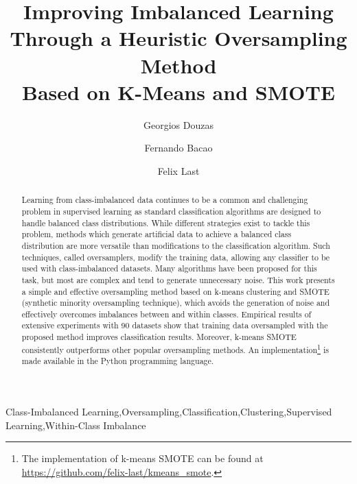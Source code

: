 \documentclass[sort&compress]{elsarticle}
\begin{document}
\begin{frontmatter}

\title{Improving Imbalanced Learning \\Through a Heuristic Oversampling Method \\Based on K-Means and SMOTE}

\author[nova]{Georgios Douzas}
\author[nova]{Fernando Bacao}
\author[nova]{Felix Last}
\address[nova]{Nova Information Management School, Campus de Campolide, 1070-312 Lisboa, Portugal \\ Telephone: +351 21 382 8610}

\begin{abstract}
Learning from class-imbalanced data continues to be a common and challenging problem in supervised learning as standard classification algorithms are designed to handle balanced class distributions. While different strategies exist to tackle this problem, methods which generate artificial data to achieve a balanced class distribution are more versatile than modifications to the classification algorithm. Such techniques, called oversamplers, modify the training data, allowing any classifier to be used with class-imbalanced datasets. Many algorithms have been proposed for this task, but most are complex and tend to generate unnecessary noise. This work presents a simple and effective oversampling method based on k-means clustering and SMOTE (synthetic minority oversampling technique), which avoids the generation of noise and effectively overcomes imbalances between and within classes. Empirical results of extensive experiments with 90 datasets show that training data oversampled with the proposed method improves classification results. Moreover, k-means SMOTE consistently outperforms other popular oversampling methods. An implementation\footnote{The implementation of k-means \acs{SMOTE} can be found at \url{https://github.com/felix-last/kmeans_smote}.} is made available in the Python programming language.
\end{abstract}

\begin{keyword}
Class-Imbalanced Learning\sep Oversampling\sep Classification\sep Clustering\sep Supervised Learning\sep Within-Class Imbalance
\end{keyword}

\end{frontmatter}
\end{document}

